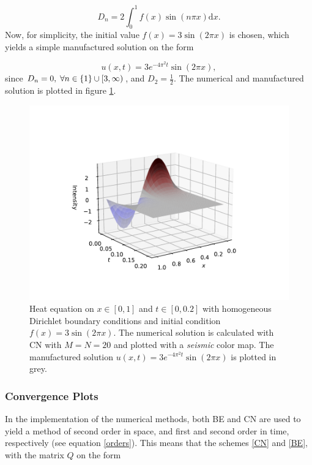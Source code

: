 \begin{equation*}
    D_n = 2 \int_{0}^{1} f(x) \sin{(n \pi x)} \mathrm{d}x.
\end{equation*}
Now, for simplicity, the initial value $f(x)=3\sin{(2 \pi x)}$ is chosen, which yields a simple manufactured solution on the form 

\begin{equation}
\label{2b-analytical-solution}
    u(x,t) = 3 e^{-4 \pi^2 t} \sin{(2 \pi x)}, 
\end{equation}
since $D_n = 0, \hspace{1mm} \forall n \in \{1\} \cup [3, \infty)$, and $D_2 = \frac12$.
The numerical and manufactured solution is plotted in figure \ref{fig: 2b_sol}.
\begin{figure}[t]
    \centering
    \includegraphics[width = 0.9\linewidth]{plots/2b_sol.pdf}
    \caption{Heat equation on $x \in [0,1]$ and $t \in [0,0.2]$ with homogeneous Dirichlet boundary conditions and initial condition $f(x)=3\sin{(2\pi x)}$. The numerical solution is calculated with CN with $M=N=20$ and plotted with a \textit{seismic} color map. The manufactured solution $u(x,t) = 3 e^{-4 \pi^2 t} \sin{(2 \pi x)}$ is plotted in grey.}
    \label{fig: 2b_sol}
\end{figure}

\subsubsection{Convergence Plots}
In the implementation of the numerical methods, both BE and CN are used to yield a method of second order in space, and first and second order in time, respectively (see equation \eqref{orders}). This means that the schemes \eqref{CN} and \eqref{BE}, with the matrix $Q$ on the form 

